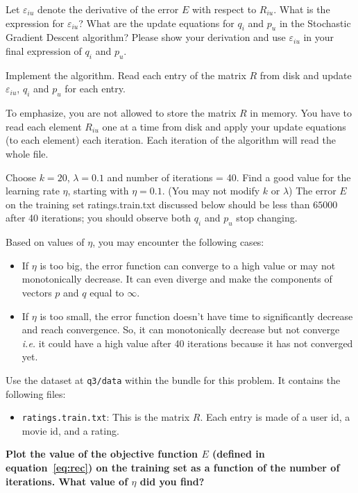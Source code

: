 
Let $\varepsilon_{iu}$ denote the derivative of the error $E$ with respect to $R_{iu}$. What is the expression for $\varepsilon_{iu}$? What are the update equations for $q_i$ and $p_u$ in the Stochastic Gradient Descent algorithm? Please show your derivation and use $\varepsilon_{iu}$ in your final expression of $q_i$ and $p_u$.


Implement the algorithm. Read each entry of the matrix
$R$ from disk and update $\varepsilon_{iu}$, $q_i$ and $p_u$ for each entry.

To emphasize, you are not allowed to store the matrix $R$ in memory. You have to read each element $R_{iu}$ one at a time from disk and apply your update equations (to each element) each iteration. Each iteration of the algorithm will read the whole file.

Choose $k=20$, $\lambda = 0.1$ and number of iterations = 40. Find a good value for the learning rate $\eta$, starting with $\eta = 0.1$. (You may not modify $k$ or $\lambda$) The error $E$ on the training set ratings.train.txt discussed below should be less than $65000$ after 40 iterations; you should observe both $q_i$ and $p_u$ stop changing. 

Based on values of $\eta$, you may encounter the following cases:
\begin{itemize}
\item If $\eta$ is too big, the error function can converge to a high value or
may not monotonically decrease. It can even diverge and make the components of vectors $p$ and $q$ equal to $\infty$.
\item If $\eta$ is too small, the error function doesn't have time to significantly decrease and reach convergence. So, it can monotonically decrease but not converge \emph{i.e.} it could have a high value after 40 iterations because it has not converged yet.
\end{itemize}

Use the dataset at \texttt{q3/data} within the bundle for this problem. It contains the following files:
\begin{itemize}
\item \texttt{ratings.train.txt}: This is the matrix $R$. Each entry is made of a user id, a movie id, and a rating. \end{itemize}

\textbf{Plot the value of the objective function $E$ (defined in equation~\ref{eq:rec}) on the training set as a function of the number of iterations. What value of $\eta$ did you find?}


